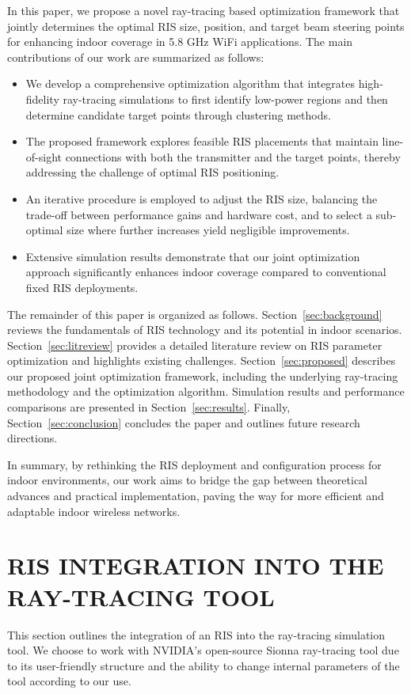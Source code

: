 \documentclass{IEEEoj}
\begin{document}
In this paper, we propose a novel ray-tracing based optimization framework that jointly determines the optimal RIS size, position, and target beam steering points for enhancing indoor coverage in 5.8 GHz WiFi applications. The main contributions of our work are summarized as follows:
\begin{itemize}
	\item We develop a comprehensive optimization algorithm that integrates high-fidelity ray-tracing simulations to first identify low-power regions and then determine candidate target points through clustering methods.
	\item The proposed framework explores feasible RIS placements that maintain line-of-sight connections with both the transmitter and the target points, thereby addressing the challenge of optimal RIS positioning.
	\item An iterative procedure is employed to adjust the RIS size, balancing the trade-off between performance gains and hardware cost, and to select a sub-optimal size where further increases yield negligible improvements.
	\item Extensive simulation results demonstrate that our joint optimization approach significantly enhances indoor coverage compared to conventional fixed RIS deployments.
\end{itemize}

The remainder of this paper is organized as follows. Section~\ref{sec:background} reviews the fundamentals of RIS technology and its potential in indoor scenarios. Section~\ref{sec:litreview} provides a detailed literature review on RIS parameter optimization and highlights existing challenges. Section~\ref{sec:proposed} describes our proposed joint optimization framework, including the underlying ray-tracing methodology and the optimization algorithm. Simulation results and performance comparisons are presented in Section~\ref{sec:results}. Finally, Section~\ref{sec:conclusion} concludes the paper and outlines future research directions.

In summary, by rethinking the RIS deployment and configuration process for indoor environments, our work aims to bridge the gap between theoretical advances and practical implementation, paving the way for more efficient and adaptable indoor wireless networks.



\section{RIS INTEGRATION INTO THE RAY-TRACING TOOL}
This section outlines the integration of an RIS into the ray-tracing simulation tool. We choose to work with NVIDIA's open-source Sionna ray-tracing tool \cite{sionna} due to its user-friendly structure and the ability to change internal parameters of the tool according to our use.
\end{document}
